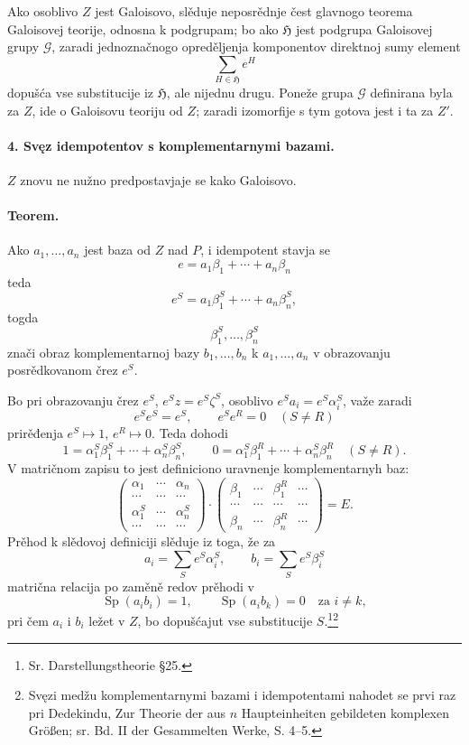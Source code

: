 \documentclass[11pt]{article}
\newcommand{\foreign}[1]{#1}
\providecommand{\Gcal}{\mathcal G}
\providecommand{\Sp}{\operatorname{Sp}}
\begin{document}
Ako osoblivo \(Z\) jest Galoisovo, slěduje neposrědnje čest glavnogo teorema Galoisovej teorije, odnosna k podgrupam; bo ako \(\mathfrak H\) jest podgrupa Galoisovej grupy \(\Gcal\), zaradi jednoznačnogo opreděljenja komponentov direktnoj sumy element
\[
        \sum_{H\in\mathfrak H} e^H
\]
dopušća vse substitucije iz \(\mathfrak H\), ale nijednu drugu. Poneže grupa \(\Gcal\) definirana byla za \(Z\), ide o Galoisovu teoriju od \(Z\); zaradi izomorfije s tym gotova jest i ta za \(Z'\).

\paragraph{4. Svęz idempotentov s komplementarnymi bazami.}
\(Z\) znovu ne nužno predpostavjaje se kako Galoisovo.

\paragraph{Teorem.}
Ako \(a_1,\ldots,a_n\) jest baza od \(Z\) nad \(P\), i idempotent stavja se
\[
        e=a_1\beta_1+\cdots+a_n\beta_n
\]
teda
\[
        e^S=a_1\beta_1^S+\cdots+a_n\beta_n^S,
\]
togda
\[
        \beta_1^S,\ldots,\beta_n^S
\]
znači obraz komplementarnoj bazy \(b_1,\ldots,b_n\) k \(a_1,\ldots,a_n\) v obrazovanju posrědkovanom črez \(e^S\).

Bo pri obrazovanju črez \(e^S\), \(e^Sz=e^S\zeta^S\), osoblivo \(e^Sa_i=e^S\alpha_i^S\), važe zaradi
\[
        e^Se^S=e^S,\qquad e^Se^R=0\quad(S\ne R)
\]
prirěđenja \(e^S\mapsto1\), \(e^R\mapsto0\). Teda dohodi
\[
        1=\alpha_1^S\beta_1^S+\cdots+\alpha_n^S\beta_n^S,\qquad
        0=\alpha_1^S\beta_1^R+\cdots+\alpha_n^S\beta_n^R\quad(S\ne R).
\]
V matričnom zapisu to jest definiciono uravnenje komplementarnyh baz:
\[
\begin{pmatrix}
\alpha_1 & \cdots & \alpha_n\\
\cdots & \cdots & \cdots\\
\alpha_1^S & \cdots & \alpha_n^S\\
\cdots & \cdots & \cdots
\end{pmatrix}
\cdot
\begin{pmatrix}
\beta_1 & \cdots & \beta_1^R & \cdots\\
\cdots & \cdots & \cdots & \cdots\\
\beta_n & \cdots & \beta_n^R & \cdots
\end{pmatrix}
=
E.
\]
Prěhod k slědovoj definiciji slěduje iz toga, že za
\[
        a_i=\sum_S e^S\alpha_i^S,\qquad b_i=\sum_S e^S\beta_i^S
\]
matrična relacija po zaměně redov prěhodi v
\[
        \Sp(a_i b_i)=1,\qquad \Sp(a_i b_k)=0\quad\text{za }i\ne k,
\]
pri čem \(a_i\) i \(b_i\) ležet v \(Z\), bo dopušćajut vse substitucije \(S\).\footnote{Sr. \foreign{Darstellungstheorie} §25.}\footnote{Svęzi medžu komplementarnymi bazami i idempotentami nahodet se prvi raz pri Dedekindu, \foreign{Zur Theorie der aus \(n\) Haupteinheiten gebildeten komplexen Größen}; sr. Bd. II der Gesammelten Werke, S. 4--5.}
\end{document}
